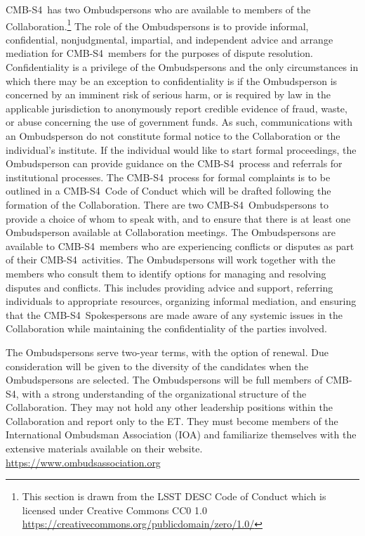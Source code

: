 \documentclass[12pt]{article}
\newcommand{\exec}{{Executive Team}}
\newcommand{\shorte}{{ET}}  %
\newcommand\collabname{CMB-S4}
\begin{document}
\collabname\ has two Ombudspersons who are available to members of the Collaboration.\footnote{This section is drawn from the LSST DESC Code of Conduct which is licensed under Creative Commons CC0 1.0 \url{https://creativecommons.org/publicdomain/zero/1.0/}} The role of the Ombudspersons is to provide informal, confidential, nonjudgmental, impartial, and independent advice and arrange mediation for \collabname\ members for the purposes of dispute resolution. Confidentiality is a privilege of the Ombudspersons and the only circumstances in which there may be an exception to confidentiality is if the Ombudsperson is concerned by an imminent risk of serious harm, or is required by law in the applicable jurisdiction to anonymously report credible evidence of fraud, waste, or abuse concerning the use of government funds. As such, communications with an Ombudsperson do not constitute formal notice to the Collaboration or the individual's institute. If the individual would like to start formal proceedings, the Ombudsperson can provide guidance on the \collabname\ process and referrals for institutional processes. The \collabname\ process for formal complaints is to be outlined in a \collabname\ Code of Conduct which will be drafted following the formation of the Collaboration. There are two \collabname\ Ombudspersons to provide a choice of whom to speak with, and to ensure that there is at least one Ombudsperson available at Collaboration meetings. The Ombudspersons are available to \collabname\ members who are experiencing conflicts or disputes as part of their \collabname\ activities. The Ombudspersons will work together with the members who consult them to identify options for managing and resolving disputes and conflicts. This includes providing advice and support, referring individuals to appropriate resources, organizing informal mediation, and ensuring that the \collabname\ Spokespersons are made aware of any systemic issues in the Collaboration while maintaining the confidentiality of the parties involved. 

The Ombudspersons serve two-year terms, with the option of renewal. Due consideration will be given to the diversity of the candidates when the Ombudspersons are selected. The Ombudspersons will be full members of \collabname, with a strong understanding of the organizational structure of the Collaboration. They may not hold any other leadership positions within the Collaboration and report only to the \shorte. They must become members of the International Ombudsman Association (IOA) and familiarize themselves with the extensive materials available on their website. \url{https://www.ombudsassociation.org}
\end{document}
